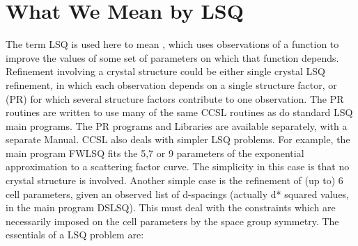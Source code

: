 %
\startdocument
\label{chap:5}
\section{What We Mean by LSQ}
% 
The term LSQ is used here to mean , 
which uses
observations of a function to improve the values of some set of
parameters on which that function depends.
\p 
Refinement involving a crystal structure could be either  single 
crystal LSQ
refinement, in which each observation depends on a single
structure factor, or  (PR) for which
several structure factors contribute to one observation.
\p 
The PR routines are written to use many of the same CCSL routines as do 
standard LSQ
main programs.  The PR programs and Libraries are available separately, with 
a separate Manual.
\p 
CCSL also deals with simpler LSQ problems.  For example, the main program
FWLSQ fits the 5,7 or 9 parameters of the exponential approximation to a 
scattering factor curve. The simplicity in this case is that no crystal structure is
involved.
Another simple case is the refinement of (up to) 6 cell parameters,
given an observed list of d-spacings (actually d* squared values, in
the main program DSLSQ).  This must deal with
the constraints which are
necessarily imposed on the cell parameters by the space group symmetry.
\p 
The essentials of a LSQ problem are:\p
